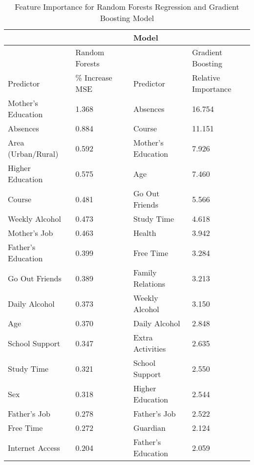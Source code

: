 \documentclass[sigconf]{acmart}
\begin{document}
\begin{table*}
  \caption{Feature Importance for Random Forests Regression and 
  Gradient Boosting Model}
  \label{tab:freq}
  \begin{tabular}{lllll}
    \toprule
            &           &  & Model & \\ 
    \midrule  
            & Random Forests & & &  Gradient Boosting \\    
    \midrule   
    Predictor           & \% Increase MSE & & Predictor &  Relative Importance \\    
    \midrule
    Mother's Education  &  1.368 &   &      Absences	        &  16.754	\\
    Absences            &  0.884 &   &      Course	            &  11.151   \\
    Area (Urban/Rural)  &  0.592 &   &      Mother's Education  &   7.926	\\
    Higher Education    &  0.575 &   &      Age	                &   7.460   \\   
    Course              &  0.481 &   &      Go Out Friends	    &   5.566   \\ 
    Weekly Alcohol      &  0.473 &   &      Study Time          &   4.618   \\
    Mother's Job        &  0.463 &   &      Health	            &   3.942   \\  
    Father's Education  &  0.399 &   &      Free Time	        &   3.284	\\      
    Go Out Friends      &  0.389 &   &      Family Relations 	&   3.213	\\
    Daily Alcohol       &  0.373 &   &      Weekly Alcohol      &   3.150	\\
    Age                 &  0.370 &   &      Daily Alcohol       &   2.848   \\
    School Support      &  0.347 &   &      Extra Activities    &   2.635   \\  
    Study Time          &  0.321 &   &      School Support  	&   2.550   \\
    Sex                 &  0.318 &   &      Higher Education	&   2.544   \\
    Father's Job        &  0.278 &   &      Father's Job 	    &   2.522   \\     
    Free Time           &  0.272 &   &      Guardian            &   2.124	\\
    Internet Access     &  0.204 &   &      Father's Education  &   2.059   \\   

\end{tabular}
\end{table*}
\end{document}
